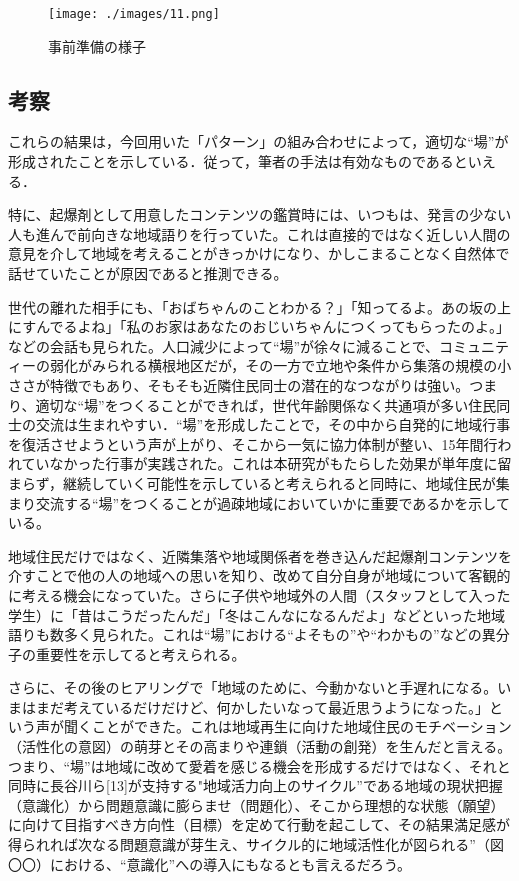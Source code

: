 \documentclass[a4paper]{jsarticle}
\begin{document}
\begin{figure}[H]
  \begin{center}
    \texttt{[image: ./images/11.png]}
    \caption{事前準備の様子}
    \label{fig:tmu_hino}
  \end{center}
\end{figure}

\subsection{考察}
これらの結果は，今回用いた「パターン」の組み合わせによって，適切な“場”が形成されたことを示している．従って，筆者の手法は有効なものであるといえる．\par
特に、起爆剤として用意したコンテンツの鑑賞時には、いつもは、発言の少ない人も進んで前向きな地域語りを行っていた。これは直接的ではなく近しい人間の意見を介して地域を考えることがきっかけになり、かしこまることなく自然体で話せていたことが原因であると推測できる。
\par
世代の離れた相手にも、「おばちゃんのことわかる？」「知ってるよ。あの坂の上にすんでるよね」「私のお家はあなたのおじいちゃんにつくってもらったのよ。」などの会話も見られた。人口減少によって“場”が徐々に減ることで、コミュニティーの弱化がみられる横根地区だが，その一方で立地や条件から集落の規模の小ささが特徴でもあり、そもそも近隣住民同士の潜在的なつながりは強い。つまり、適切な“場”をつくることができれば，世代年齢関係なく共通項が多い住民同士の交流は生まれやすい．“場”を形成したことで，その中から自発的に地域行事を復活させようという声が上がり、そこから一気に協力体制が整い、15年間行われていなかった行事が実践された。これは本研究がもたらした効果が単年度に留まらず，継続していく可能性を示していると考えられると同時に、地域住民が集まり交流する“場”をつくることが過疎地域においていかに重要であるかを示している。\par
地域住民だけではなく、近隣集落や地域関係者を巻き込んだ起爆剤コンテンツを介すことで他の人の地域への思いを知り、改めて自分自身が地域について客観的に考える機会になっていた。さらに子供や地域外の人間（スタッフとして入った学生）に「昔はこうだったんだ」「冬はこんなになるんだよ」などといった地域語りも数多く見られた。これは“場”における“よそもの”や“わかもの”などの異分子の重要性を示してると考えられる。\par
さらに、その後のヒアリングで「地域のために、今動かないと手遅れになる。いまはまだ考えているだけだけど、何かしたいなって最近思うようになった。」という声が聞くことができた。これは地域再生に向けた地域住民のモチベーション（活性化の意図）の萌芽とその高まりや連鎖（活動の創発）を生んだと言える。つまり、“場”は地域に改めて愛着を感じる機会を形成するだけではなく、それと同時に長谷川ら[13]が支持する"地域活力向上のサイクル”である地域の現状把握（意識化）から問題意識に膨らませ（問題化）、そこから理想的な状態（願望）に向けて目指すべき方向性（目標）を定めて行動を起こして、その結果満足感が得られれば次なる問題意識が芽生え、サイクル的に地域活性化が図られる”（図〇〇）における、“意識化”への導入にもなるとも言えるだろう。
\end{document}
